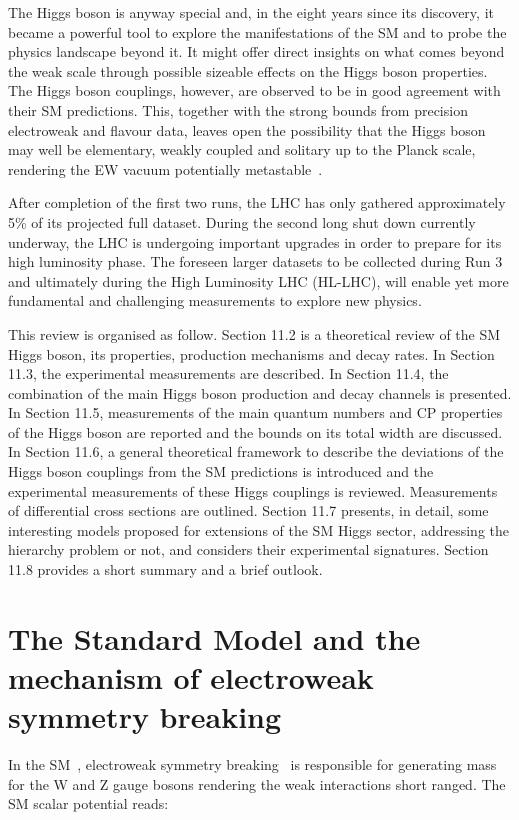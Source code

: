 \documentclass[12pt]{article}
\begin{document}
The Higgs boson is anyway special and, in the eight years since its discovery, it became a powerful tool to explore the manifestations of the SM and to probe the physics landscape beyond it. It might offer direct insights on what comes beyond the weak scale through possible sizeable effects on the Higgs boson properties. The Higgs boson couplings, however, are observed to be in good agreement with their SM predictions. This, together with the strong bounds from precision electroweak and flavour data, leaves open the possibility that the Higgs boson may well be elementary, weakly coupled and solitary up to the Planck scale, rendering the EW vacuum potentially metastable~\cite{Degrassi:2012ry,Alekhin:2012py,Buttazzo:2013uya}.

After completion of the first two runs, the LHC has only gathered approximately 5\% of its projected full dataset. During the second long shut down currently underway, the LHC is undergoing important upgrades in order to prepare for its high luminosity phase. The foreseen larger datasets to be collected during Run 3 and ultimately during the High Luminosity LHC (HL-LHC), will enable yet more fundamental and challenging measurements to explore new physics.

This review is organised as follow. Section 11.2 is a theoretical review of the SM Higgs boson, its properties, production mechanisms and decay rates. In Section 11.3, the experimental measurements are described. In Section 11.4, the combination of the main Higgs boson production and decay channels is presented. In Section 11.5, measurements of the main quantum numbers and CP properties of the Higgs boson are reported and the bounds on its total width are discussed. In Section 11.6, a general theoretical framework to describe the deviations of the Higgs boson couplings from the SM predictions is introduced and the experimental measurements of these Higgs couplings is reviewed. Measurements of differential cross sections are outlined. Section 11.7 presents, in detail, some interesting models proposed for extensions of the SM Higgs sector, addressing the hierarchy problem or not, and considers their experimental signatures. Section 11.8 provides a short summary and a brief outlook.

\section{The Standard Model and the mechanism of electroweak symmetry breaking}

In the SM~\cite{Glashow:1961tr,PhysRevLett.19.1264,PhysRevD.2.1285}, electroweak symmetry breaking~\cite{PhysRevLett.13.321,PhysRev.145.1156} is responsible for generating mass for the W and Z gauge bosons rendering the weak interactions short ranged. The SM scalar potential reads:
\end{document}
